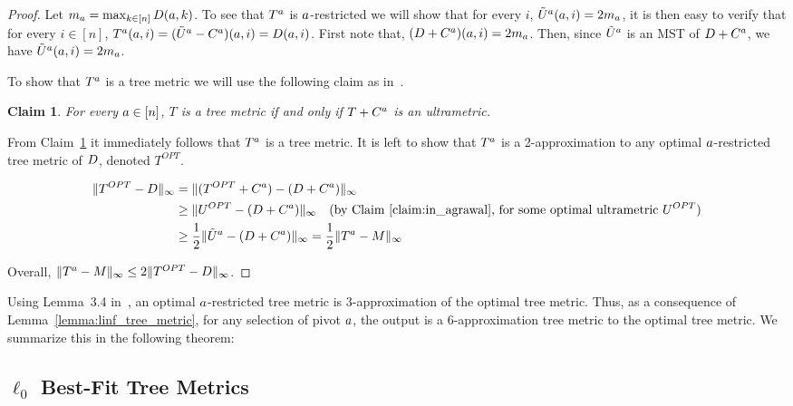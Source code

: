 \documentclass{article}
\newtheorem{claim}[theorem]{Claim}
\begin{document}
\begin{proof}    
Let $m_a = \max_{k \in [n]}D (a,k)$.
To see that $T^a$ is $a$-restricted we will show that for every $i$, $\tilde{U}^a (a,i) = 2m_a$, it is then easy to verify that for every $i \in [n]$, $T^a(a,i)=(\tilde{U}^a - C^a)(a,i) = D(a,i)$.
First note that, $(D + C^a)(a,i) = 2m_a$. Then, since $\tilde{U}^a$ is an MST of $D + C^a$, we have $\tilde{U}^a (a,i) = 2m_a$.

To show that $T^a$ is a tree metric we will use the following claim as in~\cite{agarwala}.

\begin{claim}\label{claim:in_agrawal}
For every $a \in [n]$, $T$ is a tree metric if and only if $T+C^a$ is an ultrametric.
\end{claim}

From Claim~\ref{claim:in_agrawal} it immediately follows that $T^a$ is a tree metric.
It is left to show that $T^a$ is a 2-approximation to any optimal $a$-restricted tree metric of $D$, denoted $T^{OPT}$.

\begin{align*}
\lVert T^{OPT}-D \rVert_{\infty} &= \lVert (T^{OPT}+C^a)-(D+C^a) \rVert_{\infty} \\
&\geq \lVert U^{OPT}-(D+C^a) \rVert_{\infty} \quad \text{(by Claim~\ref{claim:in_agrawal}, for some optimal ultrametric $U^{OPT}$)} \\
&\geq \frac{1}{2}\lVert \tilde{U}^a-(D+C^a) \rVert_{\infty} = \frac{1}{2} \lVert T^a - M \rVert_{\infty}
\end{align*}

Overall, $\lVert T^a - M \rVert_{\infty} \leq 2\lVert T^{OPT}-D \rVert_{\infty}$.
\end{proof}

Using Lemma~3.4 in~\cite{agarwala}, an optimal $a$-restricted tree metric is 3-approximation of the optimal tree metric. Thus, as a consequence of Lemma~\ref{lemma:linf_tree_metric}, for any selection of pivot $a$, the output is a 6-approximation tree metric to the optimal tree metric. We summarize this in the following theorem:

\inftyreduction* 

\subsection{\texorpdfstring{$\ell_0$ Best-Fit Tree Metrics}{l-0 Best-Fit Tree Metrics}} 
\end{document}
